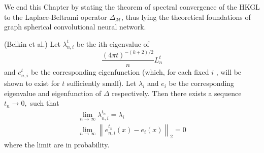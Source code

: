 We end this Chapter by stating the theorem of spectral convergence of the HKGL to the Laplace-Beltrami operator $\Delta_\mathcal M$, thus lying the theoretical foundations of graph spherical convolutional neural network.

\begin{theorem}(Belkin et al.)\label{theo:spectral convergence}
	 Let \(\lambda_{n, i}^{t}\) be the ith eigenvalue of 
	 $$
	 \frac{(4\pi t)^{-(k+2)/2}}{n}L^t_n
	 $$
	 and \(e_{n, i}^{t}\) be the corresponding eigenfunction (which, for each fixed \(i\) , will be shown to exist for \(t\) sufficiently small). Let \(\lambda_{i}\) and \(e_{i}\) be the corresponding eigenvalue and eigenfunction of \(\Delta\) respectively. Then there exists a sequence \(t_{n} \rightarrow 0,\) such that
	\begin{equation}
	\begin{array}{c}{\lim _{n \rightarrow \infty} \lambda_{n, i}^{t_{n}}=\lambda_{i}} \\ {\lim _{n \rightarrow \infty}\left\|e_{n, i}^{t_{n}}(x)-e_{i}(x)\right\|_{2}=0}\end{array}
	\end{equation}
	where the limit are in probability.
\end{theorem}





